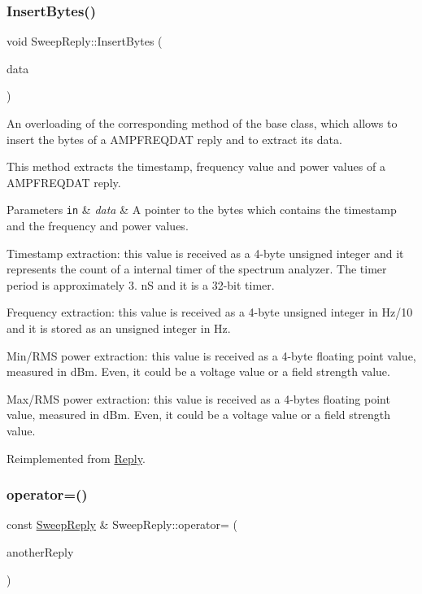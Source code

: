 \subsubsection{\texorpdfstring{Insert\+Bytes()}{InsertBytes()}}
{\footnotesize\ttfamily void Sweep\+Reply\+::\+Insert\+Bytes (\begin{DoxyParamCaption}\item[{const std\+::uint8\+\_\+t $\ast$}]{data }\end{DoxyParamCaption})\hspace{0.3cm}{\ttfamily [virtual]}}



An overloading of the corresponding method of the base class, which allows to insert the bytes of a A\+M\+P\+F\+R\+E\+Q\+D\+AT reply and to extract its data. 

This method extracts the timestamp, frequency value and power values of a A\+M\+P\+F\+R\+E\+Q\+D\+AT reply. 
\begin{DoxyParams}[1]{Parameters}
\mbox{\tt in}  & {\em data} & A pointer to the bytes which contains the timestamp and the frequency and power values. \\
\hline
\end{DoxyParams}
Timestamp extraction\+: this value is received as a 4-\/byte unsigned integer and it represents the count of a internal timer of the spectrum analyzer. The timer period is approximately 3. nS and it is a 32-\/bit timer.

Frequency extraction\+: this value is received as a 4-\/byte unsigned integer in Hz/10 and it is stored as an unsigned integer in Hz.

Min/\+R\+MS power extraction\+: this value is received as a 4-\/byte floating point value, measured in d\+Bm. Even, it could be a voltage value or a field strength value.

Max/\+R\+MS power extraction\+: this value is received as a 4-\/bytes floating point value, measured in d\+Bm. Even, it could be a voltage value or a field strength value. 

Reimplemented from \hyperlink{classReply_a005fb1894b469cc16e69bf93fed967af}{Reply}.

\mbox{\label{classSweepReply_a37bfa46a9b437720ba551dd68875eeaa}} 
\subsubsection{\texorpdfstring{operator=()}{operator=()}}
{\footnotesize\ttfamily const \hyperlink{classSweepReply}{Sweep\+Reply} \& Sweep\+Reply\+::operator= (\begin{DoxyParamCaption}\item[{const \hyperlink{classSweepReply}{Sweep\+Reply} \&}]{another\+Reply }\end{DoxyParamCaption})}




